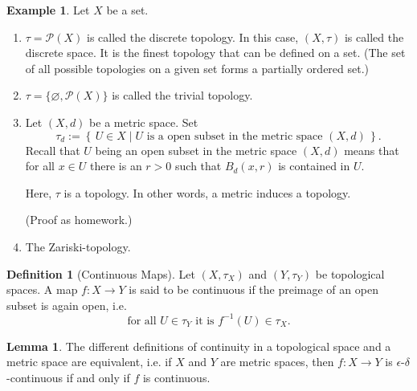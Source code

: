 \documentclass[a4paper]{book}
\theoremstyle{definition}
\newtheorem{definition}{Definition}[chapter]
\newtheorem{example}{Example}[definition]
\newtheorem{lemma}{Lemma}[definition]
\newcommand{\makeset}[2]{\left\{\, #1 \mid #2 \,\right\}}
\begin{document}
\begin{example}
    Let \(X\) be a {\color{mathif}set}.
    \begin{enumerate}
        \item \(\tau = \mathcal{P}(X)\) is called the {\color{maththen}discrete topology}. In this case, \((X, \tau)\) is called the {\color{maththen}discrete space}. It is the {\color{mathrem}finest topology} that can be defined on a set. (The set of all possible topologies on a given set forms a partially ordered set.)
        \item \(\tau = \{\varnothing, \mathcal{P}(X)\}\) is called the {\color{maththen}trivial topology}.
        \item Let \((X, d)\) be a {\color{mathif}metric space}. Set
        \begin{equation}
            \tau_d := \makeset{U \in X}{U \text{ is a open subset in the metric space } (X, d)} \text{.}
        \end{equation}
        Recall that \(U\) being an open subset in the metric space \((X, d)\) means that for all \(x \in U\) there is an \(r > 0\) such that \(B_d(x, r)\) is contained in \(U\).

        Here, \(\tau\) is a topology. In other words, a metric induces a topology.

        (Proof as homework.)
        \item The Zariski-topology.
    \end{enumerate}
\end{example}
\begin{defbox}
    \begin{definition}[Continuous Maps]
        Let \((X, \tau_X)\) and \((Y, \tau_Y)\) be {\color{mathif}topological spaces}. A {\color{mathif}map} \(f: X \longrightarrow Y\) is said to be {\color{maththen}continuous} if the preimage of an open subset is again open, i.e.
        \begin{equation}
            \text{for all } U \in \tau_Y \text{ it is } f^{-1}(U) \in \tau_X \text{.}
        \end{equation}
    \end{definition}
\end{defbox}
\begin{thmbox}
    \begin{lemma}
        The different definitions of continuity in a topological space and a metric space are equivalent, i.e. if \(X\) and \(Y\) are metric spaces, then \(f: X \longrightarrow Y\) is \(\epsilon\)-\(\delta\)-continuous if and only if \(f\) is continuous.
    \end{lemma}
\end{thmbox}
\end{document}
